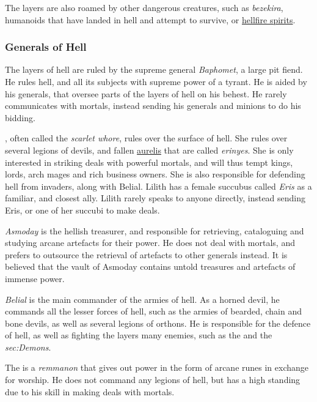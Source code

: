 The layers are also roamed by other dangerous creatures, such as
\emph{bezekira}, humanoids that have landed in hell and attempt to survive,
or \hyperref[sec:monster:Hellfire Spirit]{hellfire spirits}.

\subsubsection{Generals of Hell}

The layers of hell are ruled by the supreme general \emph{Baphomet}, a large
pit fiend. He rules hell, and all its subjects with supreme power of a
tyrant. He is aided by his generals, that oversee parts of the layers of
hell on his behest. He rarely communicates with mortals, instead sending his
generals and minions to do his bidding.

, often called the \emph{scarlet whore}, rules
over the surface of hell. She rules over several legions of devils, and fallen
\hyperref[sec:Aurelis]{aurelis} that are called \emph{erinyes}. She is only
interested in striking deals with powerful mortals, and will thus tempt kings,
lords, arch mages and rich business owners. She is also responsible for
defending hell from invaders, along with Belial. Lilith has a female succubus
called \emph{Eris} as a familiar, and closest ally. Lilith rarely speaks to
anyone directly, instead sending Eris, or one of her succubi to make deals.

\emph{Asmoday} is the hellish treasurer, and responsible for retrieving,
cataloguing and studying arcane artefacts for their power. He does not deal
with mortals, and prefers to outsource the retrieval of artefacts to other
generals instead. It is believed that the vault of Asmoday contains untold
treasures and artefacts of immense power.

\emph{Belial} is the main commander of the armies of hell. As a horned devil,
he commands all the lesser forces of hell, such as the armies of bearded,
chain and bone devils, as well as several legions of orthons. He is
responsible for the defence of hell, as well as fighting the layers many
enemies, such as the  and the \emph{sec:Demons}.

The  is a \emph{remmanon} that gives out power in the
form of arcane runes in exchange for worship. He does not command any legions
of hell, but has a high standing due to his skill in making deals with mortals.

